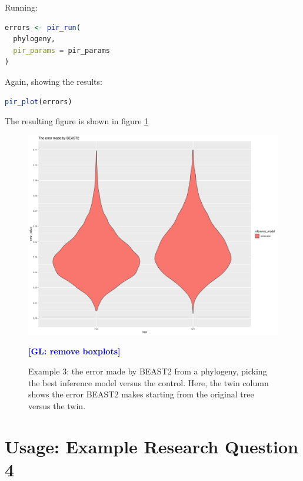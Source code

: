 \documentclass{article}
\newcommand{\giovanni}[1]{\textcolor{blue}{\textbf{[GL: #1]}}}
\begin{document}
Running:

\begin{lstlisting}[language=R, floatplacement=ht, frame=single]
errors <- pir_run(
  phylogeny,
  pir_params = pir_params
)
\end{lstlisting}

Again, showing the results:

\begin{lstlisting}[language=R, floatplacement=ht, frame=single]
pir_plot(errors)
\end{lstlisting}

The resulting figure is shown in figure \ref{fig:example_3}

\begin{figure}[ht]
  \includegraphics[width=\textwidth]{example_3_errors.png}
  \caption{
    Example 3: the error made by BEAST2 from a phylogeny, picking the best inference model versus the control.
    Here, the twin column shows the error BEAST2 makes starting from the original tree versus the twin. 
  }
  \label{fig:example_3}
  \giovanni{remove boxplots}
\end{figure}

\section{Usage: Example Research Question 4}
\end{document}
